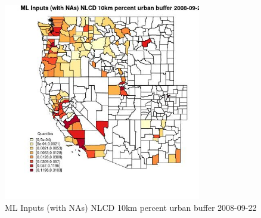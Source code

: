 \begin{figure} 
\centering  
\includegraphics[width=0.77\textwidth]{Code_Outputs/Report_ML_input_PM25_Step4_part_e_de_duplicated_aves_compiled_2019-05-18wNAs_CountyNLCD_10km_percent_urban_bufferMean2008-09-22_2008-09-22.jpg} 
\caption{\label{fig:Report_ML_input_PM25_Step4_part_e_de_duplicated_aves_compiled_2019-05-18wNAsCountyNLCD_10km_percent_urban_bufferMean2008-09-22_2008-09-22}ML Inputs (with NAs) NLCD 10km percent urban buffer 2008-09-22} 
\end{figure} 
 
